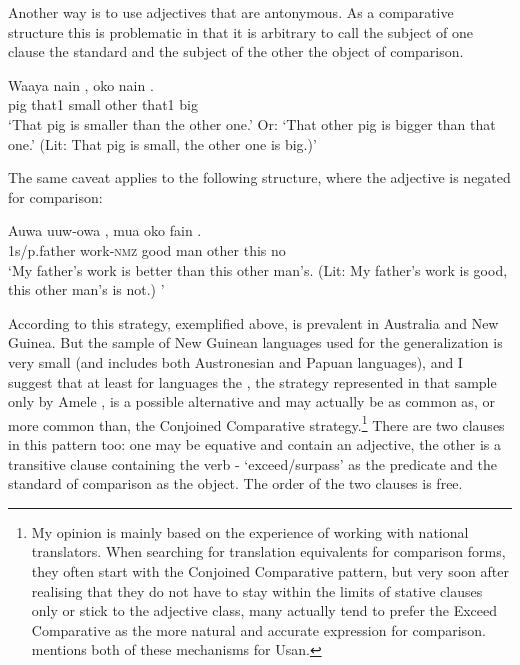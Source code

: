 Another way is to use adjectives that are antonymous. As a comparative structure this is problematic in that it is arbitrary to call the subject of one clause the standard and the subject of the other the object of comparison. 

\ea%
\label{ex:6:x1325}
\gll Waaya  nain  ,  oko  nain  . \\
pig  that1  small  other  that1  big\\
\glt `That pig is smaller than the other one.' Or: `That other pig is bigger than that one.' (Lit: That pig is small, the other one is big.)'
\z

The same caveat applies to the following structure, where the adjective is negated for comparison:

\ea%

\label{ex:6:x1326}
\gll Auwa  uuw-owa  ,  mua  oko  fain  . \\
1s/p.father  work-\textsc{nmz}  good  man  other  this  no\\
\glt `My father's work is better than this other man's. (Lit: My father's work is good, this other man's is not.) '
\z

According to \citet{Stassen2008} this  strategy, exemplified above, is prevalent in  Australia and New Guinea. But the sample of New Guinean languages used for the generalization is very small (and includes both Austronesian and Papuan languages), and I suggest that at least for  languages the , the strategy represented in that sample only by Amele \citep[134--135]{Roberts1987}, is a possible alternative and may actually be as common as, or more common than, the Conjoined Comparative strategy.\footnote{My opinion is mainly based on the experience of working with national translators. When searching for translation equivalents for comparison forms, they often start with the Conjoined Comparative pattern, but very soon after realising that they do not have to stay within the limits of stative clauses only or stick to the adjective class, many actually tend to prefer the Exceed Comparative as the more natural and accurate expression for comparison.  \citet[68]{Reesink1987} mentions both of these mechanisms for Usan. }   There are two clauses in this pattern too: one may be equative and contain an adjective, the other is a transitive clause containing the verb - `exceed/surpass' as the predicate and the standard of comparison as the object. The order of the two clauses is free.

